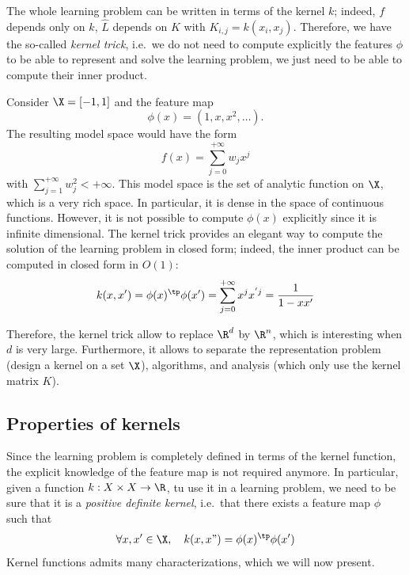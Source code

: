 \documentclass{../cs-classes/cs-classes}
\begin{document}
\begin{remark}
    The whole learning problem can be written in terms of the kernel $k$; indeed, $f$ depends only on $k$, $\hat{L}$ depends on $K$ with $K_{i, j} = k(x_i, x_j)$. Therefore, we have the so-called \emph{kernel trick}, i.e.~we do not need to compute explicitly the features $\phi$ to be able to represent and solve the learning problem, we just need to be able to compute their inner product.
\end{remark}

\begin{example}
    \leavevmode
    
    \noindent
    Consider $\X=\lbrack-1, 1\rbrack$ and the feature map
    \begin{equation*}
        \phi(x)=(1, x, x^2, \dots).
    \end{equation*}
    The resulting model space would have the form
    \begin{equation*}
        f(x)=\sum_{j=0}^{+\infty}w_jx^j
    \end{equation*}
    with $\sum_{j=1}^{+\infty}w_j^2 < +\infty$. This model space is the set of analytic function on $\X$, which is a very rich space. In particular, it is dense in the space of continuous functions. However, it is not possible to compute $\phi(x)$ explicitly since it is infinite dimensional. The kernel trick provides an elegant way to compute the solution of the learning problem in closed form; indeed, the inner product can be computed in closed form in $O(1)$:
    \begin{equation*}
        k(x, x') = \phi(x)^\tp\phi(x')=\sum_{j=0}^{+\infty}x^jx^{'j} = \frac{1}{1-xx'}
    \end{equation*}

    Therefore, the kernel trick allow to replace $\R^d$ by $\R^n$, which is interesting when $d$ is very large. Furthermore, it allows to separate the representation problem (design a kernel on a set $\X$), algorithms, and analysis (which only use the kernel matrix $K$).
\end{example}

\subsection{Properties of kernels}
Since the learning problem is completely defined in terms of the kernel function, the explicit knowledge of the feature map is not required anymore. In particular, given a function $k:X\times X \to \R$, tu use it in a learning problem, we need to be sure that it is a \emph{positive definite kernel}, i.e.~that there exists a feature map $\phi$ such that
\begin{equation*}
    \forall x, x'\in\X, \quad k(x, x") = \phi(x)^\tp \phi(x')
\end{equation*}
Kernel functions admits many characterizations, which we will now present.
\end{document}
